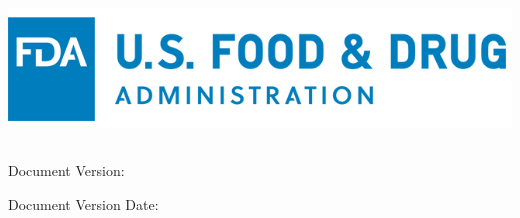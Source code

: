 \documentclass[./FDA_document_template.tex]{subfiles}
\begin{document}
\pagebreak
\setcounter{page}{1}\pagestyle{Standard}
\thispagestyle{FirstPage}

\bigskip


\bigskip


\bigskip


\bigskip


\bigskip



\begin{center}
\includegraphics[width=16.51cm,height=3.958cm]{./images/FDA_document_template_image001.png}
\end{center}


\vspace*{6cm}


\begin{center}
 
\textcolor{cyan}{\hrulefill}

\textbf{\textcolor{blue}{\docTitleLineOne}}
\par


\textbf{\textcolor[rgb]{0.19607843,0.24313726,0.30980393}{\docTitleLineTwo}}
\par

\color[rgb]{0.19607843,0.24313726,0.30980393}
\textbf{\docTitleLineThree \linebreak}
\par

\textcolor{cyan}{\hrulefill}
\end{center}

\vspace*{2cm}

{\centering
Document Version: \textup{\docVersion}
\par}

{\centering
Document Version Date: \docVersionDate
\par}


\bigskip


\bigskip


\bigskip
\end{document}
